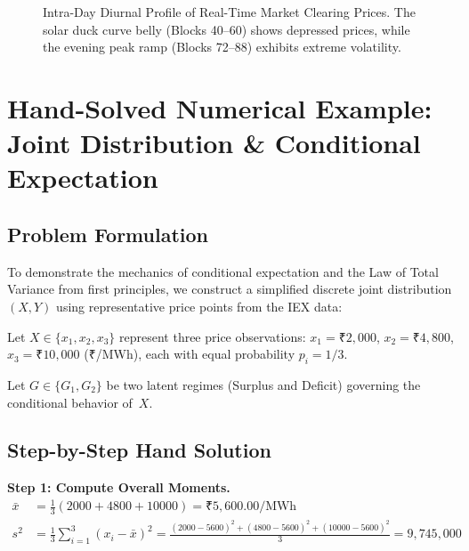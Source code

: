 \documentclass[12pt, a4paper]{article}
\theoremstyle{definition}
\newcommand{\MWh}{\text{MWh}}
\begin{document}
\begin{figure}[H]
    \centering
    \caption{Intra-Day Diurnal Profile of Real-Time Market Clearing Prices. The solar duck curve belly (Blocks 40--60) shows depressed prices, while the evening peak ramp (Blocks 72--88) exhibits extreme volatility.}
    \label{fig:diurnal}
\end{figure}

\section{Hand-Solved Numerical Example: Joint Distribution \& Conditional Expectation}

\subsection{Problem Formulation}

To demonstrate the mechanics of conditional expectation and the Law of Total Variance from first principles, we construct a simplified discrete joint distribution $(X, Y)$ using representative price points from the IEX data:

Let $X \in \{x_1, x_2, x_3\}$ represent three price observations: $x_1 = \text{₹}2{,}000$, $x_2 = \text{₹}4{,}800$, $x_3 = \text{₹}10{,}000$ (₹/MWh), each with equal probability $p_i = 1/3$.

Let $G \in \{G_1, G_2\}$ be two latent regimes (Surplus and Deficit) governing the conditional behavior of~$X$.

\subsection{Step-by-Step Hand Solution}

\textbf{Step 1: Compute Overall Moments.}
\begin{align}
    \bar{x} &= \frac{1}{3}(2000 + 4800 + 10000) = \text{₹}5{,}600.00/\MWh \\
    s^2 &= \frac{1}{3}\sum_{i=1}^{3}(x_i - \bar{x})^2 = \frac{(2000-5600)^2 + (4800-5600)^2 + (10000-5600)^2}{3} = 9{,}745{,}000
\end{align}
\end{document}
